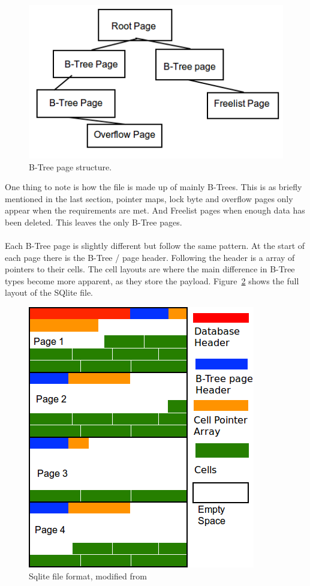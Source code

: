 \begin{figure}[H]
	\centering
	\includegraphics[scale=0.5]{images/sqlite_btree_format.png}
	\caption{B-Tree page structure.}
	\label{fig:sqlite_btree_figure}
\end{figure}

One thing to note is how the file is made up of mainly B-Trees. This is as briefly mentioned in the last section, pointer maps, lock byte and overflow pages only appear when the requirements are met. And Freelist pages when enough data has been deleted. This leaves the only B-Tree pages.
\\\\
Each B-Tree page is slightly different but follow the same pattern. At the start of each page there is the B-Tree / page header. Following the header is a array of pointers to their cells. The cell layouts are where the main difference in B-Tree types become more apparent, as they store the payload. Figure~\ref{fig:sqlite_file_format} shows the full layout of the SQlite file.

\begin{figure}[H]
	\centering
	\includegraphics[scale=0.5]{images/sqlite_file_format.png}
	\caption{Sqlite file format, modified from \cite{sausagefactory}}
	\label{fig:sqlite_file_format}
\end{figure}

